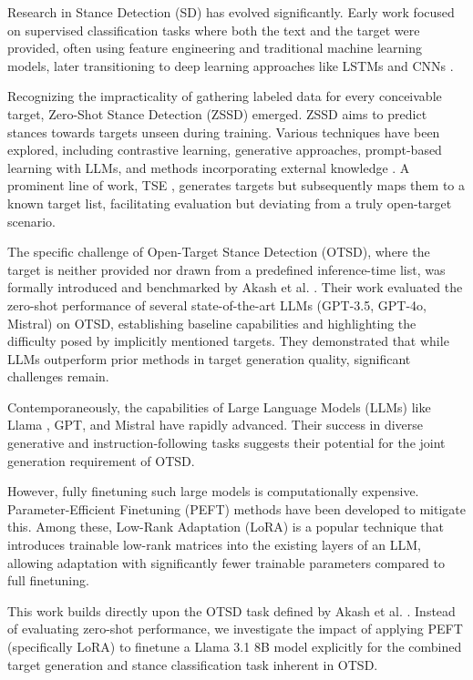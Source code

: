 \documentclass[twocolumn,11pt,letterpaper]{article}
\begin{document}
Research in Stance Detection (SD) has evolved significantly. Early work focused on supervised classification tasks where both the text and the target were provided, often using feature engineering and traditional machine learning models, later transitioning to deep learning approaches like LSTMs and CNNs \cite{vast}.

Recognizing the impracticality of gathering labeled data for every conceivable target, Zero-Shot Stance Detection (ZSSD) emerged. ZSSD aims to predict stances towards targets unseen during training. Various techniques have been explored, including contrastive learning, generative approaches, prompt-based learning with LLMs, and methods incorporating external knowledge \cite{vast}. A prominent line of work, TSE , generates targets but subsequently maps them to a known target list, facilitating evaluation but deviating from a truly open-target scenario.

The specific challenge of Open-Target Stance Detection (OTSD), where the target is neither provided nor drawn from a predefined inference-time list, was formally introduced and benchmarked by Akash et al. \cite{akash2024}. Their work evaluated the zero-shot performance of several state-of-the-art LLMs (GPT-3.5, GPT-4o, Mistral) on OTSD, establishing baseline capabilities and highlighting the difficulty posed by implicitly mentioned targets. They demonstrated that while LLMs outperform prior methods in target generation quality, significant challenges remain.

Contemporaneously, the capabilities of Large Language Models (LLMs) like Llama \cite{llama3.1}, GPT, and Mistral have rapidly advanced. Their success in diverse generative and instruction-following tasks suggests their potential for the joint generation requirement of OTSD.

However, fully finetuning such large models is computationally expensive. Parameter-Efficient Finetuning (PEFT) methods have been developed to mitigate this. Among these, Low-Rank Adaptation (LoRA) \cite{lora} is a popular technique that introduces trainable low-rank matrices into the existing layers of an LLM, allowing adaptation with significantly fewer trainable parameters compared to full finetuning.

This work builds directly upon the OTSD task defined by Akash et al. \cite{akash2024}. Instead of evaluating zero-shot performance, we investigate the impact of applying PEFT (specifically LoRA) to finetune a Llama 3.1 8B model explicitly for the combined target generation and stance classification task inherent in OTSD.
\end{document}
